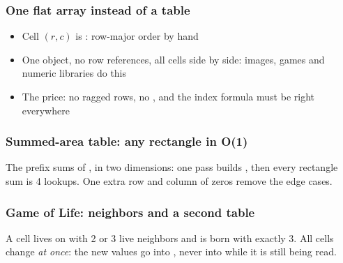 \documentclass[aspectratio=169,10pt,compress]{beamer}
\begin{document}
\begin{frame}[t,fragile] \frametitle{One flat array instead of a table}

	\begin{itemize}\footnotesize
		\item Cell $(r, c)$ is : row-major order by hand
		\item One object, no row references, all cells side by side: images, games and numeric libraries do this
		\item The price: no ragged rows, no , and the index formula must be right everywhere
	\end{itemize}
\end{frame}








\begin{frame}[t,fragile] \frametitle{Summed-area table: any rectangle in O(1)}

	\footnotesize The prefix sums of , in two dimensions: one pass builds ,
	then every rectangle sum is 4 lookups. One extra row and column of zeros remove the edge cases.
\end{frame}




\begin{frame}[t,fragile] \frametitle{Game of Life: neighbors and a second table}

	\footnotesize A cell lives on with 2 or 3 live neighbors and is born with exactly 3. All cells change \emph{at once}:
	the new values go into , never into  while it is still being read.
\end{frame}
\end{document}
